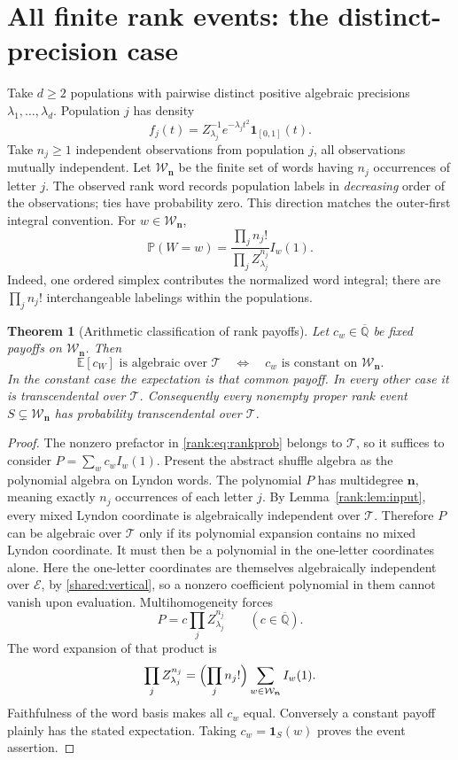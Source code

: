 \documentclass[11pt,a4paper]{article}
\newcommand{\Qbar}{\overline{\mathbb Q}}
\newcommand{\E}{\mathcal E}
\newcommand{\T}{\mathcal T}
\newcommand{\PP}{\mathbb P}
\newcommand{\EE}{\mathbb E}
\newtheorem{theorem}{Theorem}[section]
\theoremstyle{definition}
\theoremstyle{remark}
\numberwithin{equation}{section}
\begin{document}
\section{All finite rank events: the distinct-precision case}
Take $d\ge2$ populations with pairwise distinct positive algebraic
precisions $\lambda_1,\ldots,\lambda_d$. Population $j$ has density
\[
 f_j(t)=Z_{\lambda_j}^{-1}e^{-\lambda_jt^2}\mathbf1_{[0,1]}(t).
\]
Take $n_j\ge1$ independent observations from population $j$, all
observations mutually independent. Let $\mathcal W_{\boldsymbol n}$
be the finite set of words having $n_j$ occurrences of letter $j$.
The observed rank word records population labels in \emph{decreasing}
order of the observations; ties have probability zero. This direction
matches the outer-first integral convention. For
$w\in\mathcal W_{\boldsymbol n}$,
\begin{equation}
 \PP(W=w)=
 \frac{\prod_j n_j!}{\prod_jZ_{\lambda_j}^{n_j}}I_w(1).
 \label{rank:eq:rankprob}
\end{equation}
Indeed, one ordered simplex contributes the normalized word integral;
there are $\prod_jn_j!$ interchangeable labelings within the populations.

\begin{theorem}[Arithmetic classification of rank payoffs]\label{rank:thm:payoff}
Let $c_w\in\Qbar$ be fixed payoffs on
$\mathcal W_{\boldsymbol n}$. Then
\[
 \EE[c_W]\text{ is algebraic over }\T
 \quad\Longleftrightarrow\quad
 c_w\text{ is constant on }\mathcal W_{\boldsymbol n}.
\]
In the constant case the expectation is that common payoff. In every
other case it is transcendental over $\T$.
Consequently every nonempty proper rank event
$S\subsetneq\mathcal W_{\boldsymbol n}$ has probability
transcendental over $\T$.
\end{theorem}
\begin{proof}
The nonzero prefactor in \eqref{rank:eq:rankprob} belongs to $\T$, so it
suffices to consider $P=\sum_wc_wI_w(1)$. Present the abstract shuffle
algebra as the polynomial algebra on Lyndon words. The polynomial $P$
has multidegree $\boldsymbol n$, meaning exactly $n_j$ occurrences
of each letter $j$. By Lemma~\ref{rank:lem:input}, every mixed Lyndon
coordinate is algebraically independent over $\T$. Therefore $P$
can be algebraic over $\T$ only if its polynomial expansion contains
no mixed Lyndon coordinate. It must then be a polynomial in the
one-letter coordinates alone. Here the one-letter coordinates are
themselves algebraically independent over $\E$, by
\ref{shared:vertical}, so a nonzero coefficient polynomial
in them cannot vanish upon evaluation. Multihomogeneity forces
\[
 P=c\prod_j Z_{\lambda_j}^{n_j}\qquad(c\in\Qbar).
\]
The word expansion of that product is
\[
 \prod_j Z_{\lambda_j}^{n_j}
   =\Bigl(\prod_j n_j!\Bigr)
      \sum_{w\in\mathcal W_{\boldsymbol n}}I_w(1).
\]
Faithfulness of the word basis makes all $c_w$ equal.
Conversely a constant payoff plainly has the stated expectation.
Taking $c_w=\mathbf1_S(w)$ proves the event assertion.
\end{proof}
\end{document}
